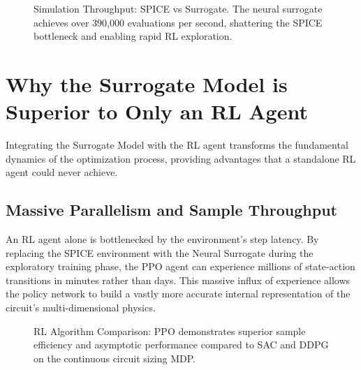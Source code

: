 \documentclass[11pt, a4paper]{article}
\begin{document}
\begin{figure}[!htbp]
    \centering
    \caption{Simulation Throughput: SPICE vs Surrogate. The neural surrogate achieves over 390,000 evaluations per second, shattering the SPICE bottleneck and enabling rapid RL exploration.}
    \label{fig:throughput}
\end{figure}

\section{Why the Surrogate Model is Superior to Only an RL Agent}
Integrating the Surrogate Model with the RL agent transforms the fundamental dynamics of the optimization process, providing advantages that a standalone RL agent could never achieve.

\subsection*{Massive Parallelism and Sample Throughput}
An RL agent alone is bottlenecked by the environment's step latency. By replacing the SPICE environment with the Neural Surrogate during the exploratory training phase, the PPO agent can experience millions of state-action transitions in minutes rather than days. This massive influx of experience allows the policy network to build a vastly more accurate internal representation of the circuit's multi-dimensional physics.

\begin{figure}[!htbp]
    \centering
    \caption{RL Algorithm Comparison: PPO demonstrates superior sample efficiency and asymptotic performance compared to SAC and DDPG on the continuous circuit sizing MDP.}
\end{figure}
\end{document}
